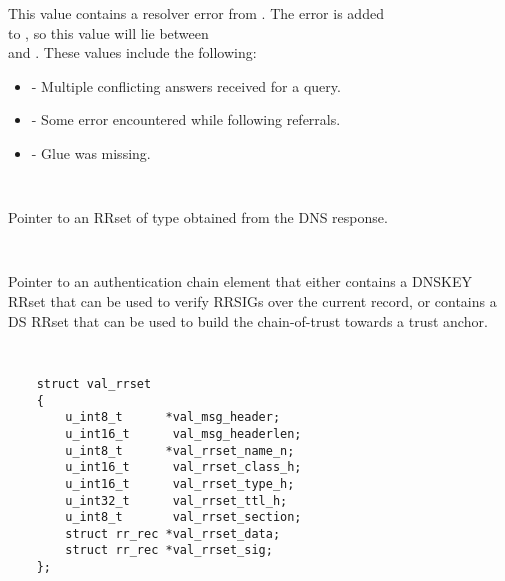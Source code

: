 \begin{description}
\begin{description}
\begin{itemize}
This value contains a resolver error from .  The 
error is added \\
to , so this value will lie between \\
 and .
These values include the following:

\begin{itemize}

\item {} - Multiple conflicting answers received
for a query.

\item {} - Some error encountered while following
referrals.

\item {} - Glue was missing.

\end{itemize}

\end{itemize}

\item {}\verb" "

Pointer to an RRset of type  obtained from the DNS
response.

\item {}\verb" "

Pointer to an authentication chain element that either contains a DNSKEY RRset
that can be used to verify RRSIGs over the current record, or contains a DS
RRset that can be used to build the chain-of-trust towards a trust anchor.

\end{description}

\item {}\verb" "

\begin{verbatim}
    struct val_rrset
    {
        u_int8_t      *val_msg_header; 
        u_int16_t      val_msg_headerlen;
        u_int8_t      *val_rrset_name_n; 
        u_int16_t      val_rrset_class_h;
        u_int16_t      val_rrset_type_h;
        u_int32_t      val_rrset_ttl_h;
        u_int8_t       val_rrset_section;
        struct rr_rec *val_rrset_data;
        struct rr_rec *val_rrset_sig;
    };
\end{verbatim}

\begin{description}


\end{description}
\end{description}
